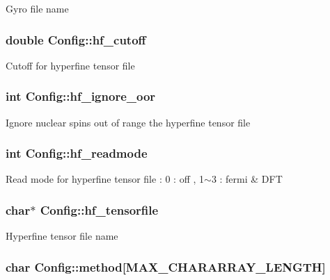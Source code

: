 Gyro file name \hypertarget{structConfig_af82a9ccd3b05247db3da179361faef85}{
\subsubsection[{hf\-\_\-cutoff}]{\setlength{\rightskip}{0pt plus 5cm}double Config\-::hf\-\_\-cutoff}}\label{structConfig_af82a9ccd3b05247db3da179361faef85}
Cutoff for hyperfine tensor file \hypertarget{structConfig_a840b086fb6ef148cea4e370967da30e9}{
\subsubsection[{hf\-\_\-ignore\-\_\-oor}]{\setlength{\rightskip}{0pt plus 5cm}int Config\-::hf\-\_\-ignore\-\_\-oor}}\label{structConfig_a840b086fb6ef148cea4e370967da30e9}
Ignore nuclear spins out of range the hyperfine tensor file \hypertarget{structConfig_a3d4d5a3943f20928bdce09e64fa4bb37}{
\subsubsection[{hf\-\_\-readmode}]{\setlength{\rightskip}{0pt plus 5cm}int Config\-::hf\-\_\-readmode}}\label{structConfig_a3d4d5a3943f20928bdce09e64fa4bb37}
Read mode for hyperfine tensor file \-: 0 \-: off , 1$\sim$3 \-: fermi \& D\-F\-T \hypertarget{structConfig_a52710072ec30b071e08c1b62f7450c0f}{
\subsubsection[{hf\-\_\-tensorfile}]{\setlength{\rightskip}{0pt plus 5cm}char$\ast$ Config\-::hf\-\_\-tensorfile}}\label{structConfig_a52710072ec30b071e08c1b62f7450c0f}
Hyperfine tensor file name \hypertarget{structConfig_a73d927bf5bdb0f39d024b23dc66f0c1c}{
\subsubsection[{method}]{\setlength{\rightskip}{0pt plus 5cm}char Config\-::method\mbox{[}M\-A\-X\-\_\-\-C\-H\-A\-R\-A\-R\-R\-A\-Y\-\_\-\-L\-E\-N\-G\-T\-H\mbox{]}}}\label{structConfig_a73d927bf5bdb0f39d024b23dc66f0c1c}


